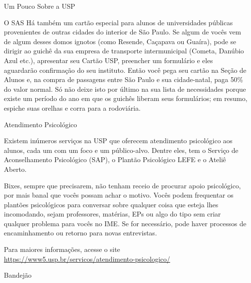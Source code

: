 \begin{secao}{Um Pouco Sobre a USP}
\begin{subsecao}{O SAS}
Há também um cartão especial para alunos de universidades públicas provenientes
de outras cidades do interior de São Paulo. Se algum de vocês vem de algum desses domos
ignotos (como Resende, Caçapava ou Guaíra), pode se dirigir ao guichê da sua empresa de
transporte intermunicipal (Cometa, Danúbio Azul etc.), apresentar seu Cartão USP,
preencher um formulário e eles aguardarão confirmação do seu instituto. Então
você pega seu cartão na Seção de Alunos e, na compra de passagens entre São Paulo
e sua cidade-natal, paga 50\% do valor normal. Só não deixe isto por último na
sua lista de necessidades porque existe um período do ano em que os guichês
liberam seus formulários; em resumo, espiche suas orelhas e corra para a rodoviária.

\end{subsecao}

\begin{subsecao}{Atendimento Psicológico}

Existem inúmeros serviços na USP que oferecem atendimento psicológico
aos alunos, cada um com um foco e um público-alvo. Dentre eles, tem
o Serviço de Aconselhamento Psicológico (SAP), o Plantão Psicológico
LEFE e o Ateliê Aberto.

Bixes, sempre que precisarem, não tenham receio de procurar apoio
psicológico, por mais banal que vocês possam achar o motivo. Vocês
podem frequentar os plantões psicológicos para conversar sobre
qualquer coisa que esteja lhes incomodando, sejam professores,
matérias, EPs ou algo do tipo sem criar qualquer
problema para vocês no IME. Se for necessário, pode haver processos
de encaminhamento ou retorno para novas entrevistas.

Para maiores informações, acesse o site
\url{https://www5.usp.br/servicos/atendimento-psicologico/}

\end{subsecao}

\begin{subsecao}{Bandejão}



\end{subsecao}
\end{secao}
